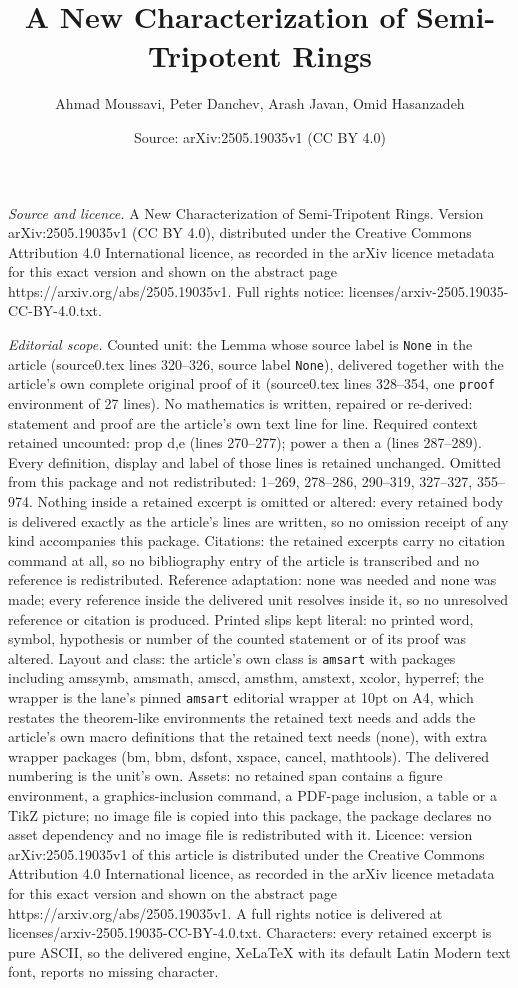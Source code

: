\documentclass[10pt,a4paper]{amsart}
\title[A New Characterization of Semi-Tripotent Rings]{A New Characterization of Semi-Tripotent Rings}
\author{Ahmad Moussavi, Peter Danchev, Arash Javan, Omid Hasanzadeh}
\date{Source: arXiv:2505.19035v1 (CC BY 4.0)}
\begin{document}
\maketitle

\noindent\emph{Source and licence.} A New Characterization of Semi-Tripotent Rings. Version arXiv:2505.19035v1 (CC BY 4.0), distributed under the Creative Commons Attribution 4.0 International licence, as recorded in the arXiv licence metadata for this exact version and shown on the abstract page https://arxiv.org/abs/2505.19035v1. Full rights notice: licenses/arxiv-2505.19035-CC-BY-4.0.txt.\par\smallskip

\noindent\textit{Editorial scope.} Counted unit: the Lemma whose source label is \texttt{None} in the article (source0.tex lines 320--326, source label \texttt{None}), delivered together with the article's own complete original proof of it (source0.tex lines 328--354, one \texttt{proof} environment of 27 lines). No mathematics is written, repaired or re-derived: statement and proof are the article's own text line for line. Required context retained uncounted: prop d,e (lines 270--277); power a then a (lines 287--289). Every definition, display and label of those lines is retained unchanged. Omitted from this package and not redistributed: 1--269, 278--286, 290--319, 327--327, 355--974. Nothing inside a retained excerpt is omitted or altered: every retained body is delivered exactly as the article's lines are written, so no omission receipt of any kind accompanies this package. Citations: the retained excerpts carry no citation command at all, so no bibliography entry of the article is transcribed and no reference is redistributed. Reference adaptation: none was needed and none was made; every reference inside the delivered unit resolves inside it, so no unresolved reference or citation is produced. Printed slips kept literal: no printed word, symbol, hypothesis or number of the counted statement or of its proof was altered. Layout and class: the article's own class is \texttt{amsart} with packages including amssymb, amsmath, amscd, amsthm, amstext, xcolor, hyperref; the wrapper is the lane's pinned \texttt{amsart} editorial wrapper at 10pt on A4, which restates the theorem-like environments the retained text needs and adds the article's own macro definitions that the retained text needs (none), with extra wrapper packages (bm, bbm, dsfont, xspace, cancel, mathtools). The delivered numbering is the unit's own. Assets: no retained span contains a figure environment, a graphics-inclusion command, a PDF-page inclusion, a table or a TikZ picture; no image file is copied into this package, the package declares no asset dependency and no image file is redistributed with it. Licence: version arXiv:2505.19035v1 of this article is distributed under the Creative Commons Attribution 4.0 International licence, as recorded in the arXiv licence metadata for this exact version and shown on the abstract page https://arxiv.org/abs/2505.19035v1. A full rights notice is delivered at licenses/arxiv-2505.19035-CC-BY-4.0.txt. Characters: every retained excerpt is pure ASCII, so the delivered engine, XeLaTeX with its default Latin Modern text font, reports no missing character.
\end{document}
